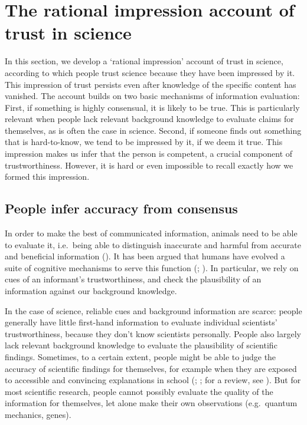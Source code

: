 \documentclass[
  jou,
  floatsintext,
  longtable,
  nolmodern,
  notxfonts,
  notimes,
  colorlinks=true,linkcolor=blue,citecolor=blue,urlcolor=blue]{apa7}
\begin{document}
\section{The rational impression account of trust in
science}\label{the-rational-impression-account-of-trust-in-science}

In this section, we develop a `rational impression' account of trust in
science, according to which people trust science because they have been
impressed by it. This impression of trust persists even after knowledge
of the specific content has vanished. The account builds on two basic
mechanisms of information evaluation: First, if something is highly
consensual, it is likely to be true. This is particularly relevant when
people lack relevant background knowledge to evaluate claims for
themselves, as is often the case in science. Second, if someone finds
out something that is hard-to-know, we tend to be impressed by it, if we
deem it true. This impression makes us infer that the person is
competent, a crucial component of trustworthiness. However, it is hard
or even impossible to recall exactly how we formed this impression.

\subsection{People infer accuracy from
consensus}\label{people-infer-accuracy-from-consensus}

In order to make the best of communicated information, animals need to
be able to evaluate it, i.e.~being able to distinguish inaccurate and
harmful from accurate and beneficial information
(). It has been argued that humans have evolved a suite of cognitive
mechanisms to serve this function
(;
). In
particular, we rely on cues of an informant's trustworthiness, and check
the plausibility of an information against our background knowledge.

In the case of science, reliable cues and background information are
scarce: people generally have little first-hand information to evaluate
individual scientists' trustworthiness, because they don't know
scientists personally. People also largely lack relevant background
knowledge to evaluate the plausibility of scientific findings.
Sometimes, to a certain extent, people might be able to judge the
accuracy of scientific findings for themselves, for example when they
are exposed to accessible and convincing explanations in school
(;
; for a review, see
). But for most scientific research, people cannot possibly
evaluate the quality of the information for themselves, let alone make
their own observations (e.g.~quantum mechanics, genes).
\end{document}
